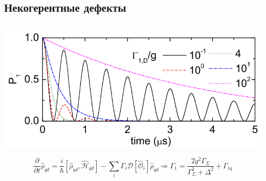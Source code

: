 \documentclass[aspectratio=169, 13pt, t]{beamer}
\begin{document}
\subsection{Некогерентные дефекты}
\begin{frame}[t]\frametitle{\secname}\framesubtitle{\subsecname}
\centering
\includegraphics[height=0.6\textheight]{defect_sim}

\[
\frac{\partial}{\partial t}\hat \rho_{qd} = \frac{i}{\hbar}\left[\hat\rho_{qd},\mathcal{\hat H}_{qd}\right] - \sum_i \Gamma_i \mathcal{D}[\mathcal{\hat O}_i]\hat \rho_{qd} \Rightarrow \Gamma_1 = \frac{2g^2\Gamma_\Sigma}{\Gamma_\Sigma^2 + \Delta^2}+\Gamma_{1q}
\]
\end{frame}
\end{document}

